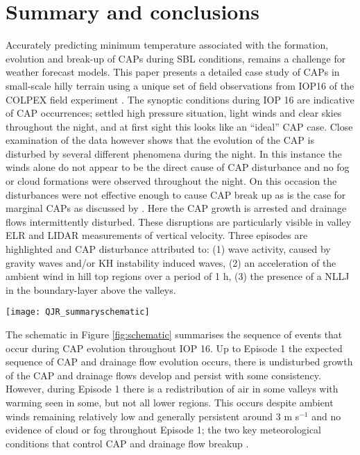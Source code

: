 \documentclass[times]{qjrms4}
\begin{document}
\section{Summary and conclusions}
\label{summary}
Accurately predicting minimum temperature associated with the formation, evolution and break-up of CAPs during SBL conditions, remains a challenge for weather forecast models. This paper presents a detailed case study of CAPs in small-scale hilly terrain using a unique set of field observations from IOP16 of the COLPEX field experiment \citep{price2010COLPEX}. The synoptic conditions during IOP 16 are indicative of CAP occurrences; settled high pressure situation, light winds and clear skies throughout the night, and at first sight this looks like an “ideal” CAP case. Close examination of the data however shows that the evolution of the CAP is disturbed by several different phenomena during the night. In this instance the winds alone do not appear to be the direct cause of CAP disturbance and no fog or cloud formations were observed throughout the night. On this occasion the disturbances were not effective enough to cause CAP break up as is the case for marginal CAPs as discussed by \citep{mahrt2015common}. Here the CAP growth is arrested and drainage flows intermittently disturbed. These disruptions are particularly visible in valley ELR and LIDAR measurements of vertical velocity. Three episodes are highlighted and CAP disturbance attributed to: (1) wave activity, caused by gravity waves and/or KH instability induced waves, (2) an acceleration of the ambient wind in hill top regions over a period of 1 h, (3) the presence of a NLLJ in the boundary-layer above the valleys.
       \begin{figure*}
        \centering
        \texttt{[image: QJR\_summaryschematic]}
        \caption{\textcolor{red}{\bf Figure needs replacing with higher def version on Stevies laptop. Either improve this figure or change to illustrate each phenomena separately} Illustration showing the sequence of events that cause CAP disruption during IOP 16.}
        \label{fig:schematic}
        \end{figure*}

The schematic in Figure \ref{fig:schematic} summarises the sequence of events that occur during CAP evolution throughout IOP 16. Up to Episode 1 the expected sequence of CAP and drainage flow evolution occurs, there is undisturbed growth of the CAP and drainage flows develop and persist with some consistency. However, during Episode 1 there is a redistribution of air in some valleys with warming seen in some, but not all lower regions. This occurs despite ambient winds remaining relatively low and generally persistent around 3 m s$^{-1}$ and no evidence of cloud or fog throughout Episode 1; the two key meteorological conditions that control CAP and drainage flow breakup \citep{sheridan2013characteristics}. 
\end{document}
